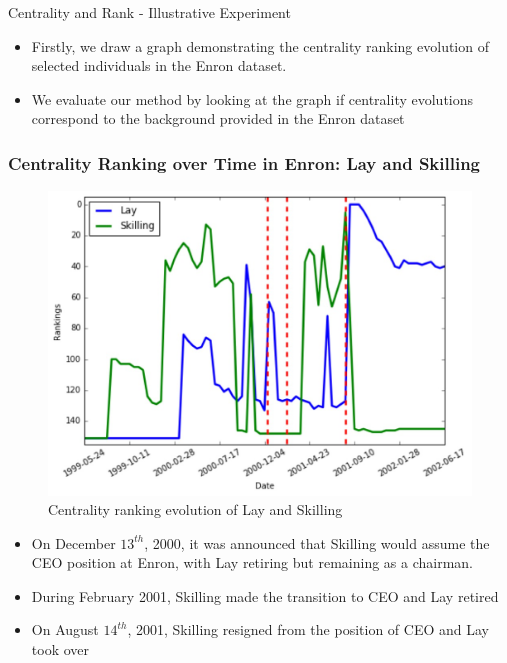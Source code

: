\documentclass[9pt]{beamer}
\begin{document}
\begin{frame}{Centrality and Rank - Illustrative Experiment}
\begin{itemize}
\item Firstly, we draw a graph demonstrating the centrality ranking evolution of selected individuals in the Enron dataset.

\item We evaluate our method by looking at the graph if centrality evolutions correspond to the background provided in the Enron dataset


\end{itemize}
\end{frame}

\begin{frame}
\frametitle{Centrality Ranking over Time in Enron: Lay and Skilling}
\begin{figure}[H]
\centering
\includegraphics[scale = 0.3]{rank_change1.png}
\caption{Centrality ranking evolution of Lay and Skilling}
\end{figure}
\vspace{-0.15in}
\begin{itemize}
\item On December $13^{th}$, 2000, it was announced that Skilling would assume the CEO position at Enron, with Lay retiring but remaining as a chairman.
\item During February 2001, Skilling made the transition to CEO and Lay retired
\item On August $14^{th}$, 2001, Skilling resigned from the position of CEO and Lay took over
\end{itemize}
\end{frame}
\end{document}

